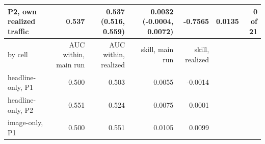 \begin{tabular}{lrrrrrr}
P2, own realized traffic & 0.537 & 0.537 (0.516, 0.559) & 0.0032 (-0.0004, 0.0072) & -0.7565 & 0.0135 & 0 of 21 \\
\midrule
by cell & AUC within, main run & AUC within, realized & skill, main run & skill, realized & & \\
\midrule
headline-only, P1 & 0.500 & 0.503 & 0.0055 & -0.0014 &  &  \\
headline-only, P2 & 0.551 & 0.524 & 0.0075 & 0.0001 &  &  \\
image-only, P1 & 0.500 & 0.551 & 0.0105 & 0.0099 &  &  \\

\end{tabular}
